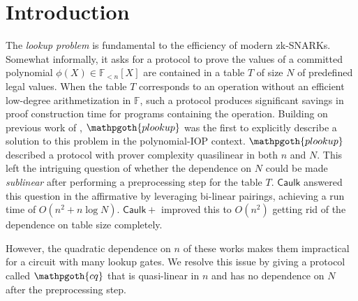 \documentclass[11pt]{article} %
\newcommand{\cq}{\ensuremath{\mathpgoth{cq} }\xspace}
\newcommand{\caulkp}{\ensuremath{\mathsf{\mathrel{Caulk}\mathrel{\scriptstyle{+}}}}\xspace}
\newcommand{\caulk}{\ensuremath{\mathsf{Caulk}}\xspace}
\newcommand{\plookup}{\ensuremath{\mathpgoth{plookup}}\xspace}
\newcommand{\F}{\ensuremath{\mathbb F}\xspace}
\newcommand{\polysofdeg}[1]{\ensuremath{\F_{< #1}[X]}\xspace}
\newcommand{\witsize}{\ensuremath{n}\xspace}
\newcommand{\tabsize}{\ensuremath{N}\xspace}
\begin{document}
\section{Introduction}
The \emph{lookup problem} is fundamental to the efficiency of modern zk-SNARKs.
Somewhat informally, it asks for a protocol to prove the values of a committed polynomial $\phi(X)\in\polysofdeg{\witsize}$ are contained in a table $T$ of size $\tabsize$ of predefined legal values.
When the table $T$ corresponds to an operation without an efficient low-degree arithmetization in $\F$, such a protocol produces significant savings in proof construction time for programs containing the operation.
Building on previous work of \cite{arya}, \plookup \cite{plookup} was the first to explicitly describe a solution to this problem in the polynomial-IOP context. \plookup described a protocol with prover complexity quasilinear in both \witsize and \tabsize.
This left the intriguing question of whether the dependence on \tabsize could be made \emph{sublinear} after performing a preprocessing step for the table $T$.
\caulk \cite{caulk} answered this question in the affirmative by leveraging bi-linear pairings, achieving a run time of $O(\witsize^2+\witsize\log \tabsize)$. \caulkp \cite{caulkp} improved this to $O(\witsize^2)$ getting rid of the dependence on table size completely. 

However, the quadratic dependence on \witsize  of these works makes them impractical for a circuit with many lookup gates.
We resolve this issue by giving a protocol called \cq that is quasi-linear in \witsize and has no dependence on \tabsize after the preprocessing step.
\end{document}
